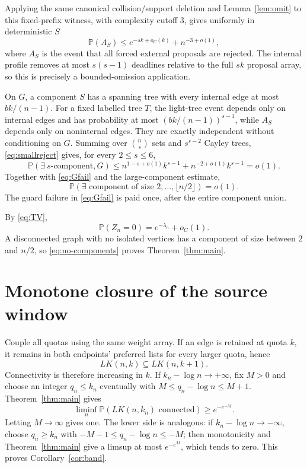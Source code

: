 \documentclass[11pt]{article}
\newcommand{\Pp}{\mathbb P}
\newcommand{\1}{\mathbf 1}
\newcommand{\LK}{LK}
\begin{document}
Applying the same canonical collision/support deletion and Lemma~\ref{lem:omit} to this
fixed-prefix witness, with complexity cutoff $3$, gives uniformly in deterministic $S$
\begin{equation}\label{eq:smallreject}
 \Pp(A_S)\le e^{-sk+o_C(k)}+n^{-3+o(1)},
\end{equation}
where $A_S$ is the event that all forced external proposals are rejected.  The internal
profile removes at most $s(s-1)$ deadlines relative to the full $sk$ proposal array, so
this is precisely a bounded-omission application.

On $G$, a component $S$ has a spanning tree with every internal edge at most $bk/(n-1)$.
For a fixed labelled tree $T$, the light-tree event depends only on internal edges and has
probability at most $(bk/(n-1))^{s-1}$, while $A_S$ depends only on noninternal edges.
They are exactly independent without conditioning on $G$.  Summing over $\binom ns$ sets
and $s^{s-2}$ Cayley trees, \eqref{eq:smallreject} gives, for every $2\le s\le6$,
\[
 \Pp(\exists\ s\text{-component},G)
 \le n^{1-s+o(1)}k^{s-1}+n^{-2+o(1)}k^{s-1}=o(1).
\]
Together with \eqref{eq:Gfail} and the large-component estimate,
\begin{equation}\label{eq:no-components}
 \Pp(\exists\text{ component of size }2,\ldots,\lfloor n/2\rfloor)=o(1).
\end{equation}
The guard failure in \eqref{eq:Gfail} is paid once, after the entire component union.

By \eqref{eq:TV},
\[
 \Pp(Z_n=0)=e^{-\lambda_n}+o_C(1).
\]
A disconnected graph with no isolated vertices has a component of size between $2$ and
$n/2$, so \eqref{eq:no-components} proves Theorem~\ref{thm:main}.

\section{Monotone closure of the source window}

Couple all quotas using the same weight array.  If an edge is retained at quota $k$, it
remains in both endpoints' preferred lists for every larger quota, hence
\[
 \LK(n,k)\subseteq\LK(n,k+1).
\]
Connectivity is therefore increasing in $k$.
If $k_n-\log n\to+\infty$, fix $M>0$ and choose an integer $q_n\le k_n$ eventually with
$M\le q_n-\log n\le M+1$.  Theorem~\ref{thm:main} gives
\[
 \liminf_n\Pp(\LK(n,k_n)\text{ connected})\ge e^{-e^{-M}}.
\]
Letting $M\to\infty$ gives one.  The lower side is analogous: if
$k_n-\log n\to-\infty$, choose $q_n\ge k_n$ with
$-M-1\le q_n-\log n\le-M$; then monotonicity and Theorem~\ref{thm:main} give a limsup at
most $e^{-e^M}$, which tends to zero.  This proves Corollary~\ref{cor:band}.
\end{document}
